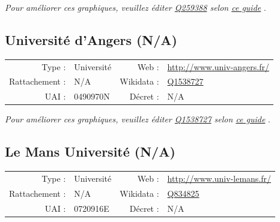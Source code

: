 \documentclass[11pt,french,landscape]{article}
\begin{document}
\textit{\scriptsize Pour améliorer ces graphiques, veuillez éditer \href{https://www.wikidata.org/entity/Q259388}{Q259388}  selon \href{https://github.com/cpesr/wikidataESR/blob/master/Rmd/wikidataESR.md}{ce guide}}
.


\newpage

\hypertarget{universituxe9-dangers-na}{%
\subsection{Université d'Angers (N/A)}\label{universituxe9-dangers-na}}

\begin{tabular*}{0.45\textwidth}{rp{2cm}rl}  
\hline  
Type : & Université & Web : &\href{http://www.univ-angers.fr/}{http://www.univ-angers.fr/} \\  
Rattachement : & N/A & Wikidata : & \href{https://www.wikidata.org/entity/Q1538727}{Q1538727} \\  
UAI : & 0490970N & Décret : & N/A \\  
\hline  
\end{tabular*}

\textit{\scriptsize Pour améliorer ces graphiques, veuillez éditer \href{https://www.wikidata.org/entity/Q1538727}{Q1538727}  selon \href{https://github.com/cpesr/wikidataESR/blob/master/Rmd/wikidataESR.md}{ce guide}}
.


\newpage

\hypertarget{le-mans-universituxe9-na}{%
\subsection{Le Mans Université (N/A)}\label{le-mans-universituxe9-na}}

\begin{tabular*}{0.45\textwidth}{rp{2cm}rl}  
\hline  
Type : & Université & Web : &\href{http://www.univ-lemans.fr/}{http://www.univ-lemans.fr/} \\  
Rattachement : & N/A & Wikidata : & \href{https://www.wikidata.org/entity/Q834825}{Q834825} \\  
UAI : & 0720916E & Décret : & N/A \\  
\hline  
\end{tabular*}
\end{document}
